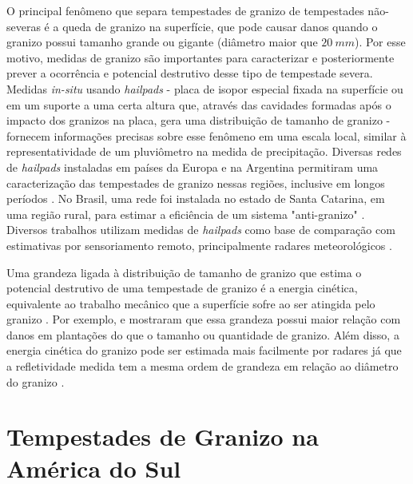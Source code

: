 O principal fenômeno que separa tempestades de granizo de tempestades não-severas é a queda de granizo na superfície, que pode causar danos quando o granizo possui tamanho grande ou gigante (diâmetro maior que $20\:mm$). Por esse motivo, medidas de granizo são importantes para caracterizar e posteriormente prever a ocorrência e potencial destrutivo desse tipo de tempestade severa. Medidas \textit{in-situ} usando \textit{hailpads} - placa de isopor especial fixada na superfície ou em um suporte a uma certa altura que, através das cavidades formadas após o impacto dos granizos na placa, gera uma distribuição de tamanho de granizo \cite{Schleusener1960a, Decker1961} - fornecem informações precisas sobre esse fenômeno em uma escala local, similar à representatividade de um pluviômetro na medida de precipitação. Diversas redes de \textit{hailpads} instaladas em países da Europa \cite{Dessens1998, Svabik1989, Giaiotti2003, Pocakal2009, Berthet2011} e na Argentina \cite{Sanchez2009} permitiram uma caracterização das tempestades de granizo nessas regiões, inclusive em longos períodos \cite{Berthet2013}. No Brasil, uma rede foi instalada no estado de Santa Catarina, em uma região rural, para estimar a eficiência de um sistema "anti-granizo" \cite{Iliine2010}. Diversos trabalhos utilizam medidas de \textit{hailpads} como base de comparação com estimativas por sensoriamento remoto, principalmente radares meteorológicos \cite{Waldvogel1978a, Schmid1992, Sanchez2013}.

Uma grandeza ligada à distribuição de tamanho de granizo que estima o potencial destrutivo de uma tempestade de granizo é a energia cinética, equivalente ao trabalho mecânico que a superfície sofre ao ser atingida pelo granizo \cite{Martins2017}. Por exemplo,  e  mostraram que essa grandeza possui maior relação com danos em plantações do que o tamanho ou quantidade de granizo. Além disso, a energia cinética do granizo pode ser estimada mais facilmente por radares já que a refletividade medida tem a mesma ordem de grandeza em relação ao diâmetro do granizo \cite{Waldvogel1978a}.

\section{Tempestades de Granizo na América do Sul}

